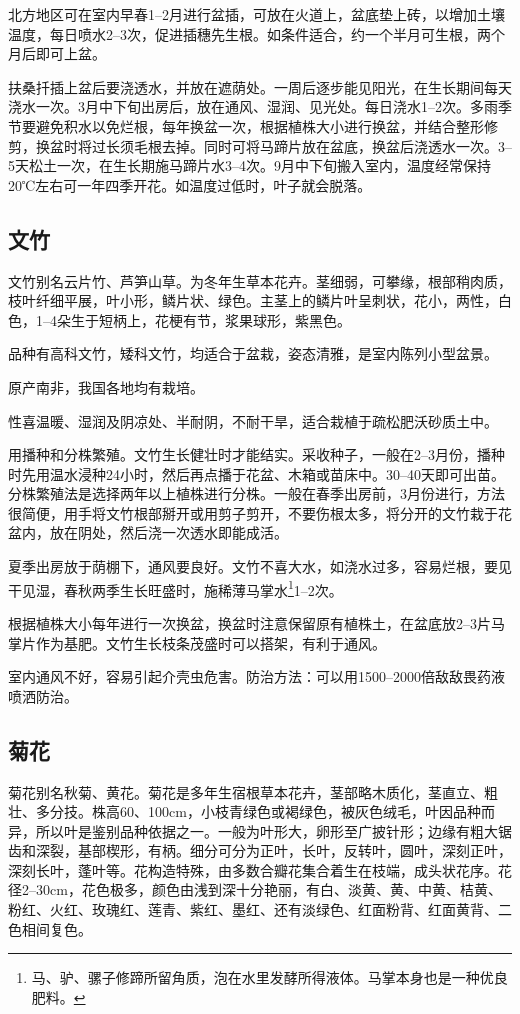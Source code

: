 \documentclass{ctexbook}
\begin{document}
北方地区可在室内早春1--2月进行盆插，可放在火道上，盆底垫上砖，以增加土壤温度，每日喷水2--3次，促进插穗先生根。如条件适合，约一个半月可生根，两个月后即可上盆。

扶桑扦插上盆后要浇透水，并放在遮荫处。一周后逐步能见阳光，在生长期间每天浇水一次。3月中下旬出房后，放在通风、湿润、见光处。每日浇水1--2次。多雨季节要避免积水以免烂根，每年换盆一次，根据植株大小进行换盆，并结合整形修剪，换盆时将过长须毛根去掉。同时可将马蹄片放在盆底，换盆后浇透水一次。3--5天松土一次，在生长期施马蹄片水3--4次。9月中下旬搬入室内，温度经常保持20℃左右可一年四季开花。如温度过低时，叶子就会脱落。
\subsection{文竹}
文竹别名云片竹、芦笋山草。为冬年生草本花卉。茎细弱，可攀缘，根部稍肉质，枝叶纤细平展，叶小形，鳞片状、绿色。主茎上的鳞片叶呈刺状，花小，两性，白色，1--4朵生于短柄上，花梗有节，浆果球形，紫黑色。

品种有高科文竹，矮科文竹，均适合于盆栽，姿态清雅，是室内陈列小型盆景。

原产南非，我国各地均有栽培。

性喜温暖、湿润及阴凉处、半耐阴，不耐干旱，适合栽植于疏松肥沃砂质土中。

用播种和分株繁殖。文竹生长健壮时才能结实。采收种子，一般在2--3月份，播种时先用温水浸种24小时，然后再点播于花盆、木箱或苗床中。30--40天即可出苗。分株繁殖法是选择两年以上植株进行分株。一般在春季出房前，3月份进行，方法很简便，用手将文竹根部掰开或用剪子剪开，不要伤根太多，将分开的文竹栽于花盆内，放在阴处，然后浇一次透水即能成活。

夏季出房放于荫棚下，通风要良好。文竹不喜大水，如浇水过多，容易烂根，要见干见湿，春秋两季生长旺盛时，施稀薄马掌水\footnote{马、驴、骡子修蹄所留角质，泡在水里发酵所得液体。马掌本身也是一种优良肥料。}1--2次。

根据植株大小每年进行一次换盆，换盆时注意保留原有植株土，在盆底放2--3片马掌片作为基肥。文竹生长枝条茂盛时可以搭架，有利于通风。

室内通风不好，容易引起介壳虫危害。防治方法：可以用1500--2000倍敌敌畏药液喷洒防治。
\subsection{菊花}
菊花别名秋菊、黄花。菊花是多年生宿根草本花卉，茎部略木质化，茎直立、粗壮、多分技。株高60、100cm，小枝青绿色或褐绿色，被灰色绒毛，叶因品种而异，所以叶是鉴别品种依据之一。一般为叶形大，卵形至广披针形；边缘有粗大锯齿和深裂，基部楔形，有柄。细分可分为正叶，长叶，反转叶，圆叶，深刻正叶，深刻长叶，蓬叶等。花构造特殊，由多数合瓣花集合着生在枝端，成头状花序。花径2--30cm，花色极多，颜色由浅到深十分艳丽，有白、淡黄、黄、中黄、桔黄、粉红、火红、玫瑰红、莲青、紫红、墨红、还有淡绿色、红面粉背、红面黄背、二色相间复色。
\end{document}
